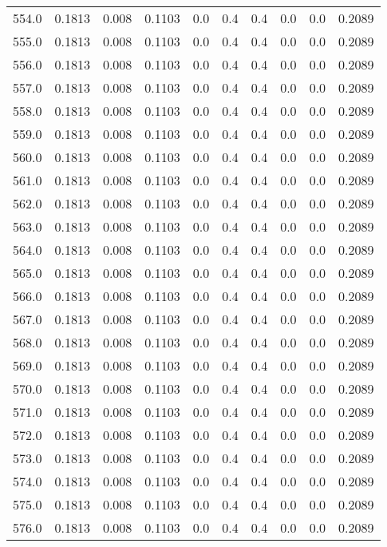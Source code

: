 \begin{longtable}{lrrrrrrrrr}
554.0 & 0.1813 & 0.008 & 0.1103 & 0.0 & 0.4 & 0.4 & 0.0 & 0.0 & 0.2089 \\
555.0 & 0.1813 & 0.008 & 0.1103 & 0.0 & 0.4 & 0.4 & 0.0 & 0.0 & 0.2089 \\
556.0 & 0.1813 & 0.008 & 0.1103 & 0.0 & 0.4 & 0.4 & 0.0 & 0.0 & 0.2089 \\
557.0 & 0.1813 & 0.008 & 0.1103 & 0.0 & 0.4 & 0.4 & 0.0 & 0.0 & 0.2089 \\
558.0 & 0.1813 & 0.008 & 0.1103 & 0.0 & 0.4 & 0.4 & 0.0 & 0.0 & 0.2089 \\
559.0 & 0.1813 & 0.008 & 0.1103 & 0.0 & 0.4 & 0.4 & 0.0 & 0.0 & 0.2089 \\
560.0 & 0.1813 & 0.008 & 0.1103 & 0.0 & 0.4 & 0.4 & 0.0 & 0.0 & 0.2089 \\
561.0 & 0.1813 & 0.008 & 0.1103 & 0.0 & 0.4 & 0.4 & 0.0 & 0.0 & 0.2089 \\
562.0 & 0.1813 & 0.008 & 0.1103 & 0.0 & 0.4 & 0.4 & 0.0 & 0.0 & 0.2089 \\
563.0 & 0.1813 & 0.008 & 0.1103 & 0.0 & 0.4 & 0.4 & 0.0 & 0.0 & 0.2089 \\
564.0 & 0.1813 & 0.008 & 0.1103 & 0.0 & 0.4 & 0.4 & 0.0 & 0.0 & 0.2089 \\
565.0 & 0.1813 & 0.008 & 0.1103 & 0.0 & 0.4 & 0.4 & 0.0 & 0.0 & 0.2089 \\
566.0 & 0.1813 & 0.008 & 0.1103 & 0.0 & 0.4 & 0.4 & 0.0 & 0.0 & 0.2089 \\
567.0 & 0.1813 & 0.008 & 0.1103 & 0.0 & 0.4 & 0.4 & 0.0 & 0.0 & 0.2089 \\
568.0 & 0.1813 & 0.008 & 0.1103 & 0.0 & 0.4 & 0.4 & 0.0 & 0.0 & 0.2089 \\
569.0 & 0.1813 & 0.008 & 0.1103 & 0.0 & 0.4 & 0.4 & 0.0 & 0.0 & 0.2089 \\
570.0 & 0.1813 & 0.008 & 0.1103 & 0.0 & 0.4 & 0.4 & 0.0 & 0.0 & 0.2089 \\
571.0 & 0.1813 & 0.008 & 0.1103 & 0.0 & 0.4 & 0.4 & 0.0 & 0.0 & 0.2089 \\
572.0 & 0.1813 & 0.008 & 0.1103 & 0.0 & 0.4 & 0.4 & 0.0 & 0.0 & 0.2089 \\
573.0 & 0.1813 & 0.008 & 0.1103 & 0.0 & 0.4 & 0.4 & 0.0 & 0.0 & 0.2089 \\
574.0 & 0.1813 & 0.008 & 0.1103 & 0.0 & 0.4 & 0.4 & 0.0 & 0.0 & 0.2089 \\
575.0 & 0.1813 & 0.008 & 0.1103 & 0.0 & 0.4 & 0.4 & 0.0 & 0.0 & 0.2089 \\
576.0 & 0.1813 & 0.008 & 0.1103 & 0.0 & 0.4 & 0.4 & 0.0 & 0.0 & 0.2089 \\

\end{longtable}
